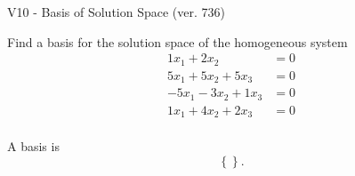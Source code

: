 \begin{exercise}
  \begin{exerciseTitle}V10 - Basis of Solution Space (ver. 736)\end{exerciseTitle}
  \begin{exerciseStatement}
    Find a basis for the solution space of the homogeneous system 
\begin{align*}
 1 x_ 1 + 2 x_ 2 &= 0  \\ 
  5 x_ 1 + 5 x_ 2 + 5 x_ 3 &= 0  \\ 
  -5 x_ 1 -3 x_ 2 + 1 x_ 3 &= 0  \\ 
  1 x_ 1 + 4 x_ 2 + 2 x_ 3 &= 0  \\ 
 \end{align*}


 
  \end{exerciseStatement}

  \begin{exerciseAnswer}
   A basis is   
\[\left\{\right\}.\]

  


  \end{exerciseAnswer}
\end{exercise}